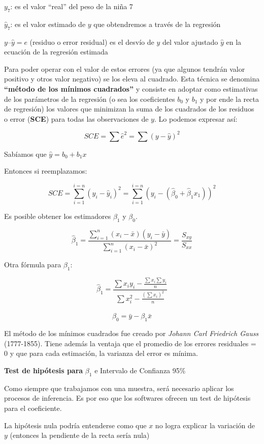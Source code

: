 \documentclass[
  letterpaper,
  DIV=11,
  numbers=noendperiod]{scrartcl}
\begin{document}
\(y_7\): es el valor ``real'' del peso de la niña 7

\(\hat{y}_7\): es el valor estimado de \(y\) que obtendremos a través de
la regresión

\(y – \hat{y} = e\) (residuo o error residual) es el desvío de \(y\) del
valor ajustado \(\hat{y}\) en la ecuación de la regresión estimada

Para poder operar con el valor de estos errores (ya que algunos tendrán
valor positivo y otros valor negativo) se los eleva al cuadrado. Esta
técnica se denomina \textbf{``método de los mínimos cuadrados''} y
consiste en adoptar como estimativas de los parámetros de la regresión
(o sea los coeficientes \(b_0\) y \(b_1\) y por ende la recta de
regresión) los valores que minimizan la suma de los cuadrados de los
residuos o error (\textbf{SCE}) para todas las observaciones de \(y\).
Lo podemos expresar así:

\[SCE = \sum{\hat{e}^2} = \sum{(y-\hat{y})^2} \]

Sabíamos que \(\hat{y} = b_0 + b_1x\)

Entonces si reemplazamos:

\[SCE = \sum_{i=1}^{i=n} (y_i-\hat{y}_i)^2 =  \sum_{i=1}^{i=n}(y_i-(\hat{\beta}_0 + \hat{\beta}_1x_1))^2\]

Es posible obtener los estimadores \(\beta_1\) y \(\beta_0\).

\[\hat{\beta}_1 = \frac{\sum_{i=1}^{n}(x_i - \bar{x})(y_i - \bar{y})}{\sum_{i=1}^{n}(x_i-\bar{x})^2} = \frac{S_{xy}}{S_{xx}}  \]

Otra fórmula para \(\beta_1\):

\[\hat{\beta}_1 = \frac{\sum x_iy_i-\frac{\sum x_i \sum y_i}{n}}{\sum x_i^2 - \frac{(\sum x_i)^2}{n}} \]

\[\hat{\beta}_0 = \bar{y} - \beta_1\bar{x}  \]

El método de los mínimos cuadrados fue creado por \emph{Johann Carl
Friedrich Gauss} (1777-1855). Tiene además la ventaja que el promedio de
los errores residuales = 0 y que para cada estimación, la varianza del
error es mínima.

\textbf{Test de hipótesis para} \(\beta_1\) e Intervalo de Confianza
95\%

Como siempre que trabajamos con una muestra, será necesario aplicar los
procesos de inferencia. Es por eso que los softwares ofrecen un test de
hipótesis para el coeficiente.

La hipótesis nula podría entenderse como que \(x\) no logra explicar la
variación de \(y\) (entonces la pendiente de la recta sería nula)
\end{document}
